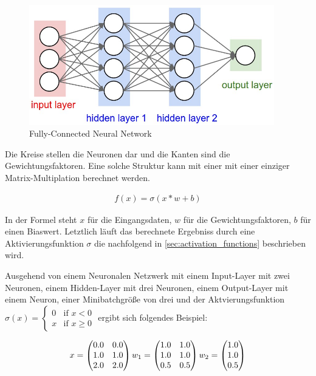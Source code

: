 \begin{figure}[H]
	\centering
	\includegraphics[width=0.95\textwidth]{resources/content/fully_connected.jpg}
	\caption{Fully-Connected Neural Network \cite{fully_connected_img}}
	\label{img:fully_connected}
\end{figure}

Die Kreise stellen die Neuronen dar und die Kanten sind die Gewichtungsfaktoren.
Eine solche Struktur kann mit einer mit einer einziger Matrix-Multiplation berechnet werden.

\begin{align}
	f(x) = \sigma(x * w + b)
\end{align}

In der Formel steht $ x $ für die Eingangsdaten, $ w $ für die Gewichtungsfaktoren, $ b $ für einen Biaswert. Letztlich läuft das berechnete Ergebniss durch eine Aktivierungsfunktion $ \sigma $ die nachfolgend in \ref{sec:activation_functions} beschrieben wird.

Ausgehend von einem Neuronalen Netzwerk mit einem Input-Layer mit zwei Neuronen,  einem Hidden-Layer mit drei Neuronen, einem Output-Layer mit einem Neuron, einer Minibatchgröße von drei  und der Aktvierungsfunktion $ \sigma(x) = {\begin{cases}0&{\text{if }}x<0\\x&{\text{if }}x\geq 0\end{cases}} $ ergibt sich folgendes Beispiel:

\begin{equation}
	\vspace{5pt}
	x = \begin{pmatrix} 
		0.0 & 0.0 \\
		1.0 & 1.0 \\ 
		2.0 & 2.0
	\end{pmatrix}
	\vspace{5pt}
	w_{1} = \begin{pmatrix} 
		1.0 & 1.0 \\
		1.0 & 1.0 \\ 
		0.5 & 0.5
	\end{pmatrix}
	\vspace{5pt}
	w_{2} = \begin{pmatrix} 
		1.0 \\
		1.0 \\ 
		0.5
	\end{pmatrix}
\end{equation}


